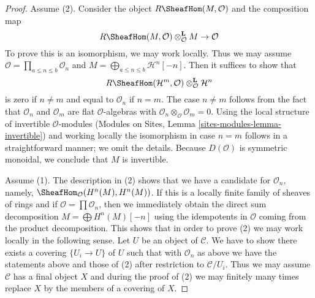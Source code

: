 \begin{proof}
Assume (2). Consider the object $R\SheafHom(M, \mathcal{O})$
and the composition map
$$
R\SheafHom(M, \mathcal{O}) \otimes_\mathcal{O}^\mathbf{L} M \to \mathcal{O}
$$
To prove this is an isomorphism, we may work locally. Thus we may
assume $\mathcal{O} = \prod_{a \leq n \leq b} \mathcal{O}_n$
and $M = \bigoplus_{a \leq n \leq b} \mathcal{H}^n[-n]$.
Then it suffices to show that
$$
R\SheafHom(\mathcal{H}^m, \mathcal{O})
\otimes_\mathcal{O}^\mathbf{L} \mathcal{H}^n
$$
is zero if $n \not = m$ and equal to $\mathcal{O}_n$ if $n = m$.
The case $n \not = m$ follows from the fact that $\mathcal{O}_n$ and
$\mathcal{O}_m$ are flat $\mathcal{O}$-algebras with
$\mathcal{O}_n \otimes_\mathcal{O} \mathcal{O}_m = 0$.
Using the local structure of invertible $\mathcal{O}$-modules
(Modules on Sites, Lemma \ref{sites-modules-lemma-invertible})
and working locally
the isomorphism in case $n = m$ follows in a straightforward manner;
we omit the details. Because $D(\mathcal{O})$ is symmetric monoidal,
we conclude that $M$ is invertible.

\medskip\noindent
Assume (1). The description in (2) shows that we have a candidate
for $\mathcal{O}_n$, namely,
$\SheafHom_\mathcal{O}(H^n(M), H^n(M))$.
If this is a locally finite family of sheaves of rings
and if $\mathcal{O} = \prod \mathcal{O}_n$, then we immediately
obtain the direct sum decomposition $M = \bigoplus H^n(M)[-n]$
using the idempotents in $\mathcal{O}$ coming from the product
decomposition. This shows that in order to prove (2) we may work
locally in the following sense. Let $U$ be an object of $\mathcal{C}$.
We have to show there exists a covering
$\{U_i \to U\}$ of $U$ such that with $\mathcal{O}_n$ as above
we have the statements above and those of (2) after
restriction to $\mathcal{C}/U_i$.
Thus we may assume $\mathcal{C}$ has a final object $X$
and during the proof of (2) we may finitely many times
replace $X$ by the members of a covering of $X$.


\end{proof}
